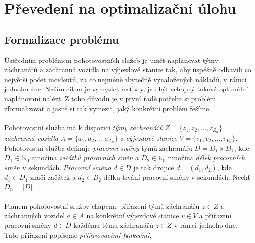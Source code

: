 \chapter{Převedení na optimalizační úlohu}

\section{Formalizace problému}

Ústředním problémem pohotovostních služeb je umět naplánovat týmy záchranářů a záchranná vozidla na výjezdové stanice tak, aby úspěšně odbavili co největší počet incidentů,
za co nejméně zbytečně vynaložených nákladů, v rámci jednoho dne.
Naším cílem je vymyslet metody, jak být schopný taková optimální naplánovaní nalézt.
Z toho důvodu je v první řadě potřeba si problém zformalizovat a jasně si tak vymezit, jaký konkrétní problém řešíme.
\\
\\
Pohotovostní služba má k dispozici \textit{týmy záchranářů} $Z = \{ z_1, z_2, \dots, z_{Z_n} \}$, \textit{záchranná vozidla} $A = \{ a_1, a_2, \dots\ a_{A_n} \}$ a \textit{výjezdové stanice} $V = \{ v_1, v_2, \dots, v_{V_n} \}$.
Pohotovostní služba definuje \textit{pracovní směny} týmů záchranářů $D = D_{1} \times D_{2}$, 
kde $D_{1} \in \mathbb{N}_0$ množina \textit{začátků pracovních směn} a $D_{2} \in \mathbb{N}_0$ množina \textit{délek pracovních směn} v sekundách.
\textit{Pracovní směna} $d \in D$ je tak dvojice $d = (d_1, d_2)$, kde $d_{1} \in D_{1}$ značí začátek a $d_{2} \in D_{2}$ délku trvání pracovní směny v sekundách.
Nechť $D_n = |D|$.
\\
\\
Plánem pohotovostní služby chápeme přiřazení týmů záchranářů $z \in Z$ a záchranných vozidel $a \in A$ na konkrétní výjezdové stanice $v \in V$
a přiřazení pracovní směny $d \in D$ každému týmu záchranářů $z \in Z$ v rámci jednoho dne.
Tato přiřazení popíšeme \textit{přiřazovacími funkcemi}, 

